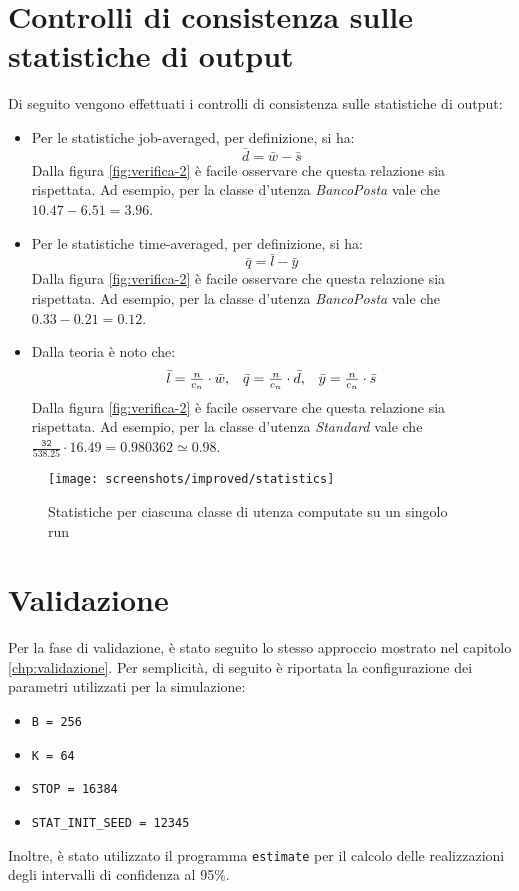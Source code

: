 \section{Controlli di consistenza sulle statistiche di output}
Di seguito vengono effettuati i controlli di consistenza sulle statistiche di output:
\begin{itemize}
\item Per le statistiche job-averaged, per definizione, si ha:
\begin{equation}
\bar{d} = \bar{w} - \bar{s}
\end{equation}
Dalla figura \ref{fig:verifica-2} è facile osservare che questa relazione sia rispettata. Ad esempio, per la classe d'utenza \uo{} \textsl{BancoPosta} vale che $\mathtt{10.47 - 6.51 = 3.96}$.
\item Per le statistiche time-averaged, per definizione, si ha:
\begin{equation}
\bar{q} = \bar{l} - \bar{y}
\end{equation}
Dalla figura \ref{fig:verifica-2} è facile osservare che questa relazione sia rispettata. Ad esempio, per la classe d'utenza \uo{} \textsl{BancoPosta} vale che $\mathtt{0.33 - 0.21 = 0.12}$.
\item Dalla teoria è noto che:
\begin{equation}
\begin{array}{c c c}
\bar{l} = \frac{n}{c_n} \cdot \bar{w}, & \bar{q} = \frac{n}{c_n} \cdot \bar{d}, & \bar{y} = \frac{n}{c_n} \cdot \bar{s} 
\end{array}
\end{equation}
Dalla figura \ref{fig:verifica-2} è facile osservare che questa relazione sia rispettata. Ad esempio, per la classe d'utenza \pp{} \textsl{Standard} vale che $\mathtt{\frac{32}{538.25} \cdot 16.49 = 0.980362 \simeq 0.98}$.
\end{itemize}

\begin{figure}[ht]  
\centering 
\texttt{[image: screenshots/improved/statistics]}
\caption{Statistiche per ciascuna classe di utenza computate su un singolo run}   
\label{fig:miglioria-verifica-3}
\end{figure}

\section{Validazione}\label{sec:miglioria-validazione}
Per la fase di validazione, è stato seguito lo stesso approccio mostrato nel capitolo \ref{chp:validazione}. Per semplicità, di seguito è riportata la configurazione dei parametri utilizzati per la simulazione:
\begin{itemize}
\item \texttt{B = 256}
\item \texttt{K = 64}
\item \texttt{STOP = 16384}
\item \texttt{STAT\_INIT\_SEED = 12345}
\end{itemize}
Inoltre, è stato utilizzato il programma \texttt{estimate} per il calcolo delle realizzazioni degli intervalli di confidenza al 95\%.

